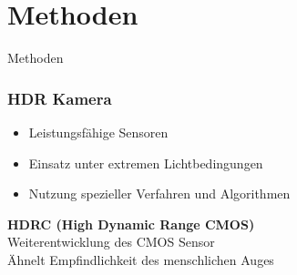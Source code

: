 \documentclass{beamer}
\begin{document}
	\section{Methoden}
	
	\begin{frame}
		\begin{center}
			\Huge Methoden
		\end{center}
	\end{frame}

	\begin{frame}
	\frametitle{HDR Kamera}
	\begin{itemize}[label=\textcolor{red!65!black}{\textbullet}]
		\item Leistungsfähige Sensoren
		\item Einsatz unter extremen Lichtbedingungen
		\item Nutzung spezieller Verfahren und Algorithmen
	\end{itemize}
	\vspace{5mm}
	\hspace{7mm} \textbf{HDRC (High Dynamic Range CMOS)} \\
	\small \hspace{9mm} Weiterentwicklung des CMOS Sensor \\
	\small \hspace{9mm} Ähnelt Empfindlichkeit des menschlichen Auges
	\end{frame}
\end{document}

